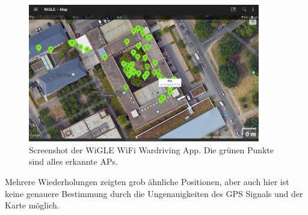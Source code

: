 \begin{figure}[h]
    \centering
    \includegraphics[width=0.9\textwidth]{figures/screen-wardriving.jpg}
    \caption{Screenshot der WiGLE WiFi Wardriving App. Die grünen Punkte sind alles erkannte APs.}
    \label{screen-wardriving}
\end{figure}

Mehrere Wiederholungen zeigten grob ähnliche Positionen, aber auch hier ist keine genauere Bestimmung durch die Ungenauigkeiten des GPS Signals und der Karte möglich.
